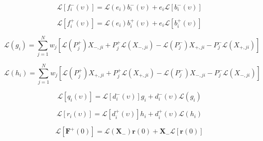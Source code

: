 \begin{equation}
\mathcal{L}\left[f^{-}_{i}(\upsilon)\right] = \mathcal{L}(e_{i}) b^{-}_{i}(\upsilon) + e_{i}\mathcal{L}\left[b^{-}_{i}(\upsilon)\right]
\label{eq:solar_source-local_solar_source-greens_function_tangent_linear-f_m_l}
\end{equation}

\begin{equation}
\mathcal{L}\left[f^{+}_{i}(\upsilon)\right] = \mathcal{L}(e_{i}) b^{+}_{i}(\upsilon) + e_{i}\mathcal{L}\left[b^{+}_{i}(\upsilon)\right]
\label{eq:solar_source-local_solar_source-greens_function_tangent_linear-f_p_l}
\end{equation}

\begin{equation}
\mathcal{L}(g_{i}) = \sum^{N}_{j = 1} w_{j} \left[\mathcal{L}(P^{+}_{j})X_{-,ji} + P^{+}_{j}\mathcal{L}(X_{-,ji}) - \mathcal{L}(P^{-}_{j})X_{+,ji} - P^{-}_{j}\mathcal{L}(X_{+,ji})\right]
\label{eq:solar_source-local_solar_source-greens_function_forward-g_l}
\end{equation}

\begin{equation}
\mathcal{L}(h_{i}) = \sum^{N}_{j = 1} w_{j} \left[\mathcal{L}(P^{+}_{j})X_{+,ji} + P^{+}_{j}\mathcal{L}(X_{+,ji}) - \mathcal{L}(P^{-}_{j})X_{-,ji} - P^{-}_{j}\mathcal{L}(X_{-,ji})\right]
\label{eq:solar_source-local_solar_source-greens_function_forward-h_l}
\end{equation}

\begin{equation}
\mathcal{L}\left[q_{i}(\upsilon)\right] = \mathcal{L}\left[d^{-}_{i}(\upsilon)\right] g_{i} + d^{-}_{i}(\upsilon) \mathcal{L}(g_{i})
\label{eq:solar_source-local_solar_source-greens_function_tangent_linear-q_l}
\end{equation}

\begin{equation}
\mathcal{L}\left[r_{i}(\upsilon)\right] = \mathcal{L}\left[d^{+}_{i}(\upsilon)\right] h_{i} + d^{+}_{i}(\upsilon) \mathcal{L}(h_{i})
\label{eq:solar_source-local_solar_source-greens_function_tangent_linear-r_l}
\end{equation}

\begin{equation}
\mathcal{L}\left[\mathbf{F}^{+}(0)\right] = \mathcal{L}(\mathbf{X}_{-})\mathbf{r}(0) + \mathbf{X}_{-}\mathcal{L}\left[\mathbf{r}(0)\right]
\label{eq:solar_source-local_solar_source-greens_function_forward-F_p_0_l}
\end{equation}

